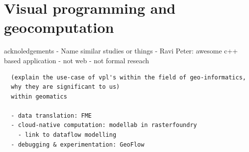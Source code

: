 \section{Visual programming and geocomputation}
\label{sec:related-geovpl}
acknoledgements
- Name similar studies or things 
  - Ravi Peter: awesome c++ based application 
    - not web
    - not formal reseach

\begin{lstlisting}
  (explain the use-case of vpl's within the field of geo-informatics, 
  why they are significant to us) 
  within geomatics

  - data translation: FME 
  - cloud-native computation: modellab in rasterfoundry
    - link to dataflow modelling
  - debugging & experimentation: GeoFlow 
  
\end{lstlisting}






